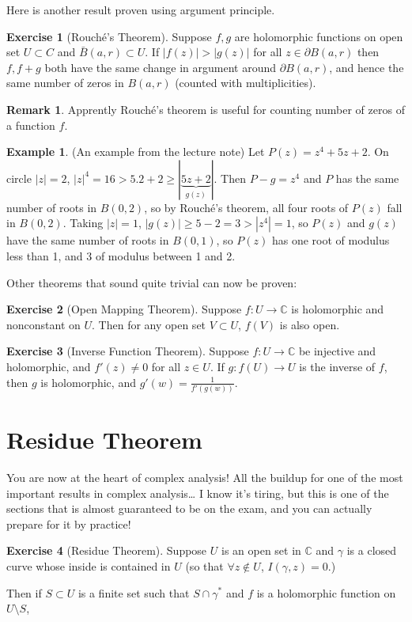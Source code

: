\documentclass[a4paper, 12pt]{article}
\theoremstyle{definition}
\newtheorem{exercise}{Exercise}
\newtheorem{example}{Example}
\newtheorem{remark}{Remark}
\numberwithin{theorem}{section}
\numberwithin{definition}{section}
\numberwithin{exercise}{section}
\numberwithin{remark}{section}
\numberwithin{figure}{section}
\numberwithin{example}{section}
\newcommand{\C}{\mathbb{C}}
\begin{document}
Here is another result proven using argument principle.
\begin{exercise}[Rouch\'e's Theorem]
    Suppose $f,g$ are holomorphic functions on open set $U \subset C$ and
    $\bar B (a,r) \subset U$.
    If $|f(z)| > |g(z)|$ for all $z \in \partial B(a,r)$ then $f,f+g$ both have the same change in argument around $\partial B (a,r)$, and hence the same number of zeros in $B(a,r)$ (counted with multiplicities).
\end{exercise}
\begin{remark}
    Apprently Rouch\'e's theorem is useful for counting number of zeros of a function $f$.
\end{remark}
\begin{example}
    (An example from the lecture note)
    Let $P(z) = z^4 + 5z + 2$. On circle $|z| = 2$, $|z|^4 = 16 > 5.2 + 2 \geq |\underbrace{5z + 2}_{g(z)}|$.
    Then $P-g = z^4$ and $P$ has the same number of roots in $B(0,2)$,
    so by Rouch\'e's theorem, all four roots of $P(z)$ fall in $B(0,2)$.
    Taking $|z|=1$, $|g(z)| \geq 5 - 2 = 3 > |z^4| = 1$, so
    $P(z)$ and $g(z)$ have the same number of roots in $B(0,1)$, so
    $P(z)$ has one root of modulus less than 1, and 3 of modulus between 1 and 2.
\end{example}
Other theorems that sound quite trivial can now be proven:
\begin{exercise}[Open Mapping Theorem]
    Suppose $f:U \rightarrow \C$ is holomorphic and nonconstant on $U$.
    Then for any open set $V \subset U$, $f(V)$ is also open.
\end{exercise}
\begin{exercise}[Inverse Function Theorem]
    Suppose $f:U \rightarrow \C$ be injective and holomorphic, and $f'(z) \neq 0$ for all $z \in U$.
    If $g: f(U) \rightarrow U$ is the inverse of $f$, then
    $g$ is holomorphic, and $g'(w) = \frac{1}{f'(g(w))}$.
\end{exercise}


\section{Residue Theorem}
You are now at the heart of complex analysis!
All the buildup for one of the most important results in complex analysis\dots
I know it's tiring, but this is one of the sections that is almost guaranteed to be on the exam,
and you can actually prepare for it by practice!
\begin{exercise}[Residue Theorem]
    Suppose $U$ is an open set in $\C$ and $\gamma$ is a closed curve whose inside is contained in $U$ (so that $\forall z \not \in U$, $I(\gamma,z) = 0$.)
\end{exercise}
Then if $S \subset U$ is a finite set such that $S \cap \gamma^*$ and $f$ is a holomorphic function on $U \setminus S$,
\end{document}
